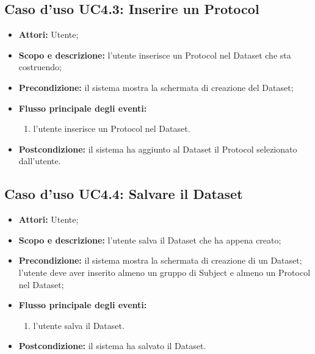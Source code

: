 \subsection{Caso d'uso UC4.3: Inserire un Protocol}
\begin{itemize}
\item \textbf{Attori:} Utente;
\item \textbf{Scopo e descrizione:} l'utente inserisce un Protocol\glossario{} nel Dataset\glossario{} che sta costruendo;
\item \textbf{Precondizione:} il sistema mostra la schermata di creazione del Dataset\glossario{};
\item \textbf{Flusso principale degli eventi:}
\begin{enumerate}
\item l'utente inserisce un Protocol\glossario{} nel Dataset\glossario{}.
\end{enumerate}
\item \textbf{Postcondizione:} il sistema ha aggiunto al Dataset\glossario{} il Protocol\glossario{} selezionato dall'utente.
\end{itemize}

\subsection{Caso d'uso UC4.4: Salvare il Dataset}
\begin{itemize}
\item \textbf{Attori:} Utente;
\item \textbf{Scopo e descrizione:} l'utente salva il Dataset\glossario{} che ha appena creato;
\item \textbf{Precondizione:} il sistema mostra la schermata di creazione di un Dataset\glossario{}; l'utente deve aver inserito almeno un gruppo di Subject\glossario{} e almeno un Protocol\glossario{} nel Dataset\glossario{};
\item \textbf{Flusso principale degli eventi:}
\begin{enumerate}
\item l'utente salva il Dataset\glossario{}.
\end{enumerate}
\item \textbf{Postcondizione:} il sistema ha salvato il Dataset\glossario{}.
\end{itemize}

